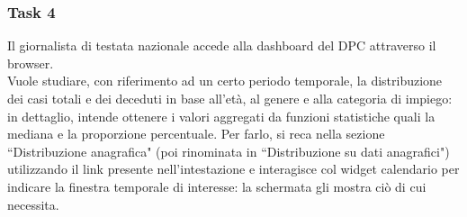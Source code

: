 \subsubsection{Task 4}
\label{sss:cw-task-4}

Il giornalista di testata nazionale accede alla dashboard del DPC attraverso il browser.\\
Vuole studiare, con riferimento ad un certo periodo temporale, la distribuzione dei casi totali e dei deceduti in base all'età, al genere e alla categoria di impiego: in dettaglio, intende ottenere i valori aggregati da funzioni statistiche quali la mediana e la proporzione percentuale.
Per farlo, si reca nella sezione ``Distribuzione anagrafica" (poi rinominata in ``Distribuzione su dati anagrafici") utilizzando il link presente nell'intestazione e interagisce col widget calendario per indicare la finestra temporale di interesse: la schermata gli mostra ciò di cui necessita.